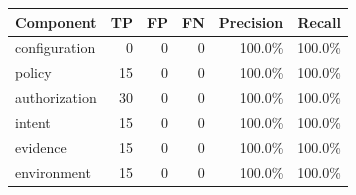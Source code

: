 \begin{tabular}{@{}lrrrrr@{}}
\toprule
Component & TP & FP & FN & Precision & Recall \\
\midrule
configuration & 0 & 0 & 0 & 100.0\% & 100.0\% \\
policy & 15 & 0 & 0 & 100.0\% & 100.0\% \\
authorization & 30 & 0 & 0 & 100.0\% & 100.0\% \\
intent & 15 & 0 & 0 & 100.0\% & 100.0\% \\
evidence & 15 & 0 & 0 & 100.0\% & 100.0\% \\
environment & 15 & 0 & 0 & 100.0\% & 100.0\% \\
\bottomrule
\end{tabular}
